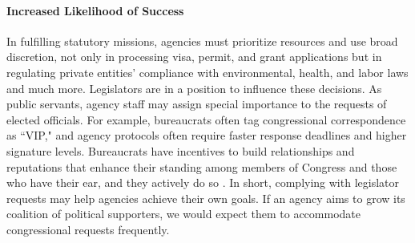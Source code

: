 \documentclass[12pt]{article}
\begin{document}
\paragraph{Increased Likelihood of Success} 

In fulfilling statutory missions, agencies must prioritize resources and use broad discretion, not only in processing visa, permit, and grant applications but in regulating private entities' compliance with environmental, health, and labor laws and much more. 
Legislators are in a position to influence these decisions.
As public servants, agency staff may assign special importance to the requests of elected officials. For example, bureaucrats often tag congressional correspondence as ``VIP," and agency protocols often require faster response deadlines and higher signature levels. %
Bureaucrats have incentives to build relationships and reputations that enhance their standing among members of Congress and those who have their ear, and they actively do so \citep{Carpenter2001}. In short, complying with legislator requests may help agencies achieve their own goals. If an agency aims to grow its coalition of political supporters, we would expect them to accommodate congressional requests frequently.
\end{document}
